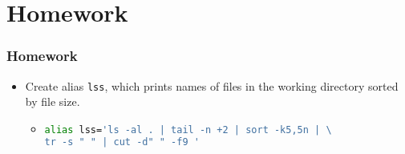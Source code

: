\section{Homework} 
\begin{frame}[fragile]
\frametitle{Homework}
	\begin{itemize}
		\item Create alias \texttt{lss}, which prints names of files in the working directory sorted by file size.
		\begin{itemize}
			\item
			\begin{footnotesize}
\begin{lstlisting}[language=bash]
alias lss='ls -al . | tail -n +2 | sort -k5,5n | \
tr -s " " | cut -d" " -f9 '
\end{lstlisting}
			\end{footnotesize}
		\end{itemize}	
		
		\begin{comment}
		\item Create shell script that prints names of the 10 largest files (including their sizes),
			which are in your home directory and in its direct  subdirectories.		
		
		\item Patching of source code
		\begin{itemize}
			\item Create directory with at least 5 files. (e.g. C project: files \texttt{*.c}, \texttt{*.h}, \texttt{Makefile}, …)
			
			
			\item Fill the files with some text (e.g. output of command \texttt{ls}, \texttt{date}, \texttt{man}, …).
			
			\item Create copy of this directory.
			\item Modify some files in new directory. Remove/create some old/new one.
			\item Use command \texttt{diff} to compare both directories.
			\item Save the output of command \texttt{diff} to the file.
			\item Use the previous file in program \texttt{patch} to create from old directory structure new directory structure.
		\end{itemize}
		\end{comment}
		
	\end{itemize}
\end{frame}


